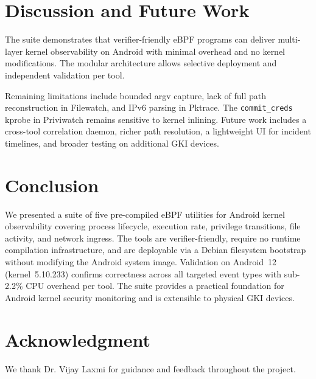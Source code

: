 \documentclass[conference]{IEEEtran}
\begin{document}
\section{Discussion and Future Work}
The suite demonstrates that verifier-friendly eBPF programs can deliver multi-layer kernel observability on Android with minimal overhead and no kernel modifications. The modular architecture allows selective deployment and independent validation per tool.

Remaining limitations include bounded argv capture, lack of full path reconstruction in Filewatch, and IPv6 parsing in Pktrace. The \texttt{commit\_creds} kprobe in Priviwatch remains sensitive to kernel inlining. Future work includes a cross-tool correlation daemon, richer path resolution, a lightweight UI for incident timelines, and broader testing on additional GKI devices.

\section{Conclusion}
We presented a suite of five pre-compiled eBPF utilities for Android kernel observability covering process lifecycle, execution rate, privilege transitions, file activity, and network ingress. The tools are verifier-friendly, require no runtime compilation infrastructure, and are deployable via a Debian filesystem bootstrap without modifying the Android system image. Validation on Android~12 (kernel~5.10.233) confirms correctness across all targeted event types with sub-2.2\% CPU overhead per tool. The suite provides a practical foundation for Android kernel security monitoring and is extensible to physical GKI devices.

\section*{Acknowledgment}
We thank Dr. Vijay Laxmi for guidance and feedback throughout the project.



\end{document}
